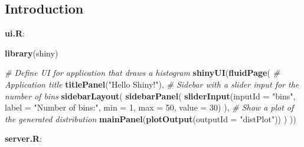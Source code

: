 \documentclass[
]{article}
\newenvironment{Shaded}{\begin{snugshade}}{\end{snugshade}}
\newcommand{\AttributeTok}[1]{\textcolor[rgb]{0.13,0.29,0.53}{#1}}
\newcommand{\CommentTok}[1]{\textcolor[rgb]{0.56,0.35,0.01}{\textit{#1}}}
\newcommand{\DecValTok}[1]{\textcolor[rgb]{0.00,0.00,0.81}{#1}}
\newcommand{\FunctionTok}[1]{\textcolor[rgb]{0.13,0.29,0.53}{\textbf{#1}}}
\newcommand{\NormalTok}[1]{#1}
\newcommand{\StringTok}[1]{\textcolor[rgb]{0.31,0.60,0.02}{#1}}
\begin{document}
\hypertarget{introduction}{%
\subsection{Introduction}\label{introduction}}

\textbf{ui.R}:

\begin{Shaded}
\begin{Highlighting}[]
\FunctionTok{library}\NormalTok{(shiny)}

\CommentTok{\# Define UI for application that draws a histogram}
\FunctionTok{shinyUI}\NormalTok{(}\FunctionTok{fluidPage}\NormalTok{(}
  \CommentTok{\# Application title}
  \FunctionTok{titlePanel}\NormalTok{(}\StringTok{"Hello Shiny!"}\NormalTok{),}
  \CommentTok{\# Sidebar with a slider input for the number of bins}
  \FunctionTok{sidebarLayout}\NormalTok{(}
    \FunctionTok{sidebarPanel}\NormalTok{(}
      \FunctionTok{sliderInput}\NormalTok{(}\AttributeTok{inputId =} \StringTok{"bins"}\NormalTok{, }
                  \AttributeTok{label =} \StringTok{"Number of bins:"}\NormalTok{,}
                  \AttributeTok{min =} \DecValTok{1}\NormalTok{, }\AttributeTok{max =} \DecValTok{50}\NormalTok{, }\AttributeTok{value =} \DecValTok{30}\NormalTok{)}
\NormalTok{    ),}
    \CommentTok{\# Show a plot of the generated distribution}
    \FunctionTok{mainPanel}\NormalTok{(}\FunctionTok{plotOutput}\NormalTok{(}\AttributeTok{outputId =} \StringTok{"distPlot"}\NormalTok{))}
\NormalTok{  )}
\NormalTok{))}
\end{Highlighting}
\end{Shaded}

\textbf{server.R}:
\end{document}
